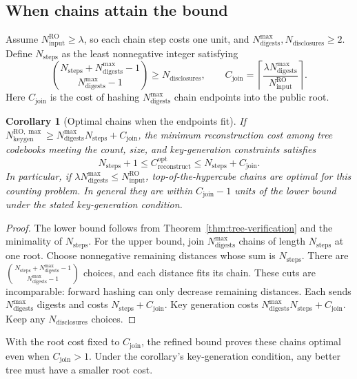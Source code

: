 \documentclass[10pt]{article}
\newtheorem{corollary}[proposition]{Corollary}
\newcommand{\roinput}{N_{\mathrm{input}}^{\mathrm{RO}}}
\newcommand{\keybudget}{N_{\mathrm{keygen}}^{\mathrm{RO},\max}}
\newcommand{\disclosurecount}{N_{\mathrm{disclosures}}}
\newcommand{\digestbudget}{N_{\mathrm{digests}}^{\max}}
\begin{document}
\subsection{When chains attain the bound}
Assume $\roinput\ge\lambda$, so each chain step costs one unit, and $\digestbudget,\disclosurecount\ge2$. Define $N_{\mathrm{steps}}$ as the least nonnegative integer satisfying
\[
 \binom{N_{\mathrm{steps}}+\digestbudget-1}{\digestbudget-1}\ge\disclosurecount,\qquad C_{\mathrm{join}}=\left\lceil\frac{\lambda\digestbudget}{\roinput}\right\rceil.
\]
Here $C_{\mathrm{join}}$ is the cost of hashing $\digestbudget$ chain endpoints into the public root.

\begin{corollary}[Optimal chains when the endpoints fit]\label{cor:optimal-chains}
If $\keybudget\ge\digestbudget N_{\mathrm{steps}}+C_{\mathrm{join}}$, the minimum reconstruction cost among tree codebooks meeting the count, size, and key-generation constraints satisfies
\[
 N_{\mathrm{steps}}+1\le C_{\mathrm{reconstruct}}^{\mathrm{opt}}\le N_{\mathrm{steps}}+C_{\mathrm{join}}.
\]
In particular, if $\lambda\digestbudget\le\roinput$, top-of-the-hypercube chains are optimal for this counting problem. In general they are within $C_{\mathrm{join}}-1$ units of the lower bound under the stated key-generation condition.
\end{corollary}
\begin{proof}
The lower bound follows from Theorem~\ref{thm:tree-verification} and the minimality of $N_{\mathrm{steps}}$. For the upper bound, join $\digestbudget$ chains of length $N_{\mathrm{steps}}$ at one root. Choose nonnegative remaining distances whose sum is $N_{\mathrm{steps}}$. There are $\binom{N_{\mathrm{steps}}+\digestbudget-1}{\digestbudget-1}$ choices, and each distance fits its chain. These cuts are incomparable: forward hashing can only decrease remaining distances. Each sends $\digestbudget$ digests and costs $N_{\mathrm{steps}}+C_{\mathrm{join}}$. Key generation costs $\digestbudget N_{\mathrm{steps}}+C_{\mathrm{join}}$. Keep any $\disclosurecount$ choices.
\end{proof}
With the root cost fixed to $C_{\mathrm{join}}$, the refined bound proves these chains optimal even when $C_{\mathrm{join}}>1$. Under the corollary's key-generation condition, any better tree must have a smaller root cost.
\end{document}
